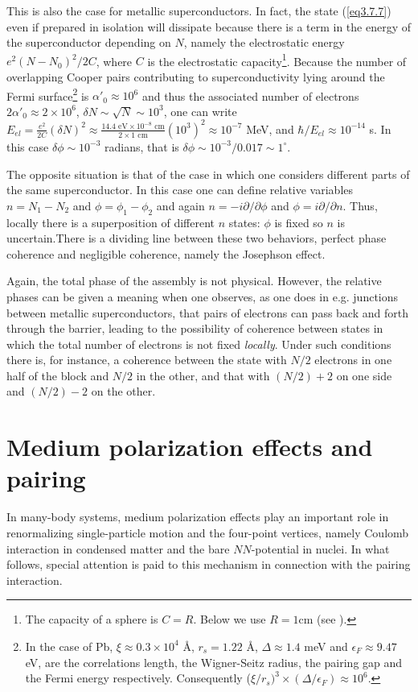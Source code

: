 This is also the case for metallic superconductors. In fact, the state (\ref{eq3.7.7}) even if prepared in isolation will dissipate because there is a term in the energy of the superconductor depending on $N$, namely the electrostatic energy $e^2(N-N_0)^2/2C$, where $C$ is the electrostatic capacity\footnote{The capacity of a sphere is $C=R$. Below we use $R=1$cm (see \cite{Anderson:64b}).}. Because the number of overlapping Cooper pairs contributing to superconductivity lying around the Fermi surface\footnote{In the case of Pb, $\xi\approx0.3\times10^4$ \AA, $r_s=1.22$ \AA, $\Delta\approx1.4$ meV and $\epsilon_F\approx9.47$ eV, are the correlations length, the Wigner-Seitz radius, the pairing gap and the Fermi energy respectively. Consequently ($\xi/r_s)^3\times(\Delta/\epsilon_F)\approx10^6$.} is $\alpha'_0\approx10^6$ and thus the associated number of electrons $2\alpha'_0\approx2\times10^6$, $\delta N\sim\sqrt{N}\sim10^3$, one can write $E_{el}=\frac{e^2}{2C}(\delta N)^2\approx\frac{14.4\text{ eV}\times10^{-8}\text{ cm}}{2\times1\text{ cm}}(10^3)^2\approx10^{-7}$ MeV, and $\hbar/E_{el}\approx 10^{-14}$ s.  In this case $\delta\phi\sim10^{-3}$ radians, that is $\delta\phi\sim10^{-3}/0.017\sim1^{\circ}$.   


The opposite situation is that of the case in which one considers different parts of the same superconductor. In this case one can define relative variables $n=N_1-N_2$ and $\phi=\phi_1-\phi_2$ and again $n=-i\partial/\partial \phi$ and $\phi=i\partial/\partial n$. Thus, locally there is a superposition of different $n$ states: $\phi$ is fixed so $n$ is uncertain.There is  a dividing line between these two behaviors, perfect phase coherence and negligible coherence, namely the Josephson effect.


Again, the total phase of the assembly is not physical. However, the relative phases can be given a meaning when one observes, as one does in e.g. junctions between metallic superconductors, that pairs of electrons can pass back and forth through the barrier, leading to the possibility of coherence between states in which the total number of electrons is not fixed \emph{locally}. Under such conditions there is, for instance, a coherence between the state with $N/2$ electrons in one half of the block and $N/2$ in the other, and that with $(N/2)+2$ on one side  and $(N/2)-2$ on the other.
\section{Medium polarization effects and pairing}\label{C3AppEx}
In many-body systems, medium polarization effects play an important role in renormalizing single-particle motion and the four-point vertices, namely Coulomb interaction in condensed matter and the bare $NN$-potential in nuclei. In what follows, special attention is paid to this mechanism in connection with the pairing interaction.
